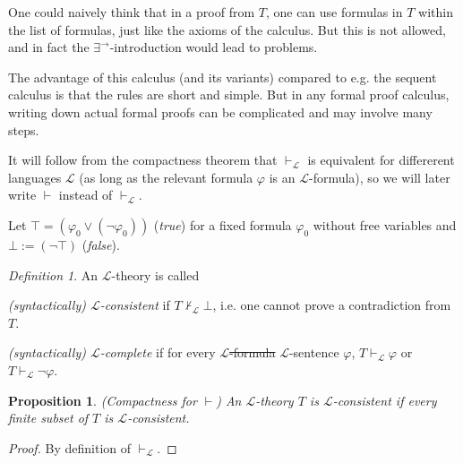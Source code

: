 \documentclass[a4paper, 11pt]{amsart}
\newtheorem{proposition}[proposition]{Proposition}
\theoremstyle{remark}
\newtheorem{definition}[definition]{Definition}
\newcommand{\cL}{\mathcal L}
\newenvironment{enumerate-(1)}{\begin{enumerate}[label={\upshape (\arabic*)}, leftmargin=2pc]}{\end{enumerate}}
\begin{document}
One could naively think that in a proof from $T$, one can use formulas in $T$ within the list of formulas, just like the axioms of the calculus. 
But this is not allowed, and in fact the $\exists^\rightarrow$-introduction would lead to problems. 

The advantage of this calculus (and its variants) compared to e.g. the sequent calculus is that the rules are short and simple. 
But in any formal proof calculus, writing down actual formal proofs can be complicated and may involve many steps. 


It will follow from the compactness theorem that $\vdash_\cL$ is equivalent for differerent languages $\cL$ (as long as the relevant formula $\varphi$ is an $\cL$-formula), so we will later  write $\vdash$ instead of $\vdash_\cL$. 

Let $\top=(\varphi_0\vee (\neg\varphi_0))$ (\emph{true}) for a fixed formula $\varphi_0$ without free variables and 
$\bot := (\neg \top)$ (\emph{false}). 

\begin{definition} 
\label{definition complete theory} 
An $\cL$-theory is called 
\begin{enumerate-(1)} 
\item 
\emph{(syntactically) $\cL$-consistent} if $T\not\vdash_{\cL} \bot$, i.e. one cannot prove a contradiction from $T$. 
\item 
\emph{(syntactically) $\cL$-complete} if for every \sout{$\cL$-formula} {\color{blue} $\cL$-sentence} $\varphi$, 
$T\vdash_\cL \varphi$ or $T\vdash_\cL \neg\varphi$. 
\end{enumerate-(1)} 
\end{definition} 

\begin{proposition}(Compactness for $\vdash$) 
An $\cL$-theory $T$ is $\cL$-consistent if every finite subset of $T$ is $\cL$-consistent. 
\end{proposition} 
\begin{proof} 
By definition of $\vdash_\cL$. 
\end{proof} 
\end{document}
